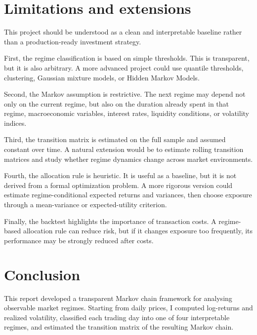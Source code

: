 \documentclass[11pt,a4paper]{article}
\begin{document}
\section{Limitations and extensions}

This project should be understood as a clean and interpretable baseline rather than a production-ready investment strategy.

First, the regime classification is based on simple thresholds. This is transparent, but it is also arbitrary. A more advanced project could use quantile thresholds, clustering, Gaussian mixture models, or Hidden Markov Models.

Second, the Markov assumption is restrictive. The next regime may depend not only on the current regime, but also on the duration already spent in that regime, macroeconomic variables, interest rates, liquidity conditions, or volatility indices.

Third, the transition matrix is estimated on the full sample and assumed constant over time. A natural extension would be to estimate rolling transition matrices and study whether regime dynamics change across market environments.

Fourth, the allocation rule is heuristic. It is useful as a baseline, but it is not derived from a formal optimization problem. A more rigorous version could estimate regime-conditional expected returns and variances, then choose exposure through a mean-variance or expected-utility criterion.

Finally, the backtest highlights the importance of transaction costs. A regime-based allocation rule can reduce risk, but if it changes exposure too frequently, its performance may be strongly reduced after costs.

\section{Conclusion}

This report developed a transparent Markov chain framework for analysing observable market regimes. Starting from daily prices, I computed log-returns and realized volatility, classified each trading day into one of four interpretable regimes, and estimated the transition matrix of the resulting Markov chain.
\end{document}
